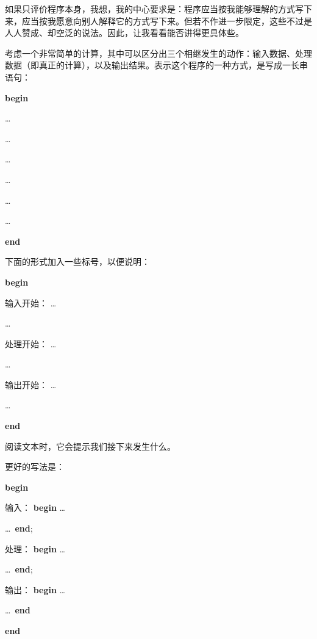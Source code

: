 \documentclass[twoside,11pt,fontset=none]{ctexbook}
\begin{document}
如果只评价程序本身，我想，我的中心要求是：程序应当按我能够理解的方式写下来，应当按我愿意向别人解释它的方式写下来。但若不作进一步限定，这些不过是人人赞成、却空泛的说法。因此，让我看看能否讲得更具体些。

考虑一个非常简单的计算，其中可以区分出三个相继发生的动作：输入数据、处理数据（即真正的计算），以及输出结果。表示这个程序的一种方式，是写成一长串语句：

\noindent
\textbf{begin}

\noindent
\quad\dots

\noindent
\quad\dots

\noindent
\quad\dots

\noindent
\quad\dots

\noindent
\quad\dots

\noindent
\quad\dots

\noindent
\textbf{end}

下面的形式加入一些标号，以便说明：

\noindent
\tabto{10em}\textbf{begin}
\nopagebreak

\noindent
输入开始：\tabto{10em} \quad\dots
\nopagebreak

\noindent
\tabto{10em} \quad\dots

\noindent
处理开始：\tabto{10em} \quad\dots
\nopagebreak

\noindent
\tabto{10em} \quad\dots

\noindent
输出开始：\tabto{10em} \quad\dots
\nopagebreak

\noindent
\tabto{10em} \quad\dots

\noindent
\tabto{10em}\textbf{end}

\noindent
阅读文本时，它会提示我们接下来发生什么。

更好的写法是：

\noindent
\tabto{10em}\textbf{begin}
\nopagebreak

\noindent
输入：\tabto{10em} \quad\textbf{begin} \tabto{14em}\dots
\nopagebreak

\noindent
\tabto{13em} \quad\dots\ \textbf{end};

\noindent
处理：\tabto{10em} \quad\textbf{begin} \tabto{14em}\dots
\nopagebreak

\noindent
\tabto{13em} \quad\dots\ \textbf{end};

\noindent
输出：\tabto{10em} \quad\textbf{begin} \tabto{14em}\dots
\nopagebreak
\nopagebreak

\noindent
\tabto{13em} \quad\dots\ \textbf{end}
\nopagebreak

\noindent
\tabto{10em}\textbf{end}
\end{document}

